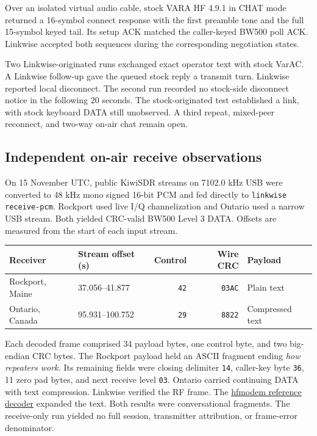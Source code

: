 \documentclass[11pt,a4paper]{article}
\begin{document}
Over an isolated virtual audio cable, stock VARA HF 4.9.1 in CHAT mode
returned a 16-symbol connect response with the first preamble tone and
the full 15-symbol keyed tail. Its setup ACK matched the caller-keyed
BW500 poll ACK. Linkwise accepted both sequences during the corresponding
negotiation states.

Two Linkwise-originated runs exchanged exact operator text with stock
VarAC. A Linkwise follow-up gave the queued stock reply a transmit turn.
Linkwise reported local disconnect. The second run recorded no stock-side
disconnect notice in the following 20 seconds. The stock-originated
test established a link, with stock keyboard DATA still unobserved.
A third repeat, mixed-peer reconnect, and two-way on-air chat remain open.

\subsection{Independent on-air receive observations}
On 15 November UTC, public KiwiSDR streams on 7102.0 kHz USB were
converted to 48 kHz mono signed 16-bit PCM and fed directly to
\verb|linkwise receive-pcm|. Rockport used live I/Q channelization and
Ontario used a narrow USB stream. Both yielded CRC-valid BW500 Level 3
DATA. Offsets are measured from the start of each input stream.

\begin{center}
\begin{tabular}{@{}llrrl@{}}
\toprule
Receiver & Stream offset (s) & Control & Wire CRC & Payload \\
\midrule
Rockport, Maine & 37.056--41.877 & \texttt{42} & \texttt{03AC} & Plain text \\
Ontario, Canada & 95.931--100.752 & \texttt{29} & \texttt{8822} & Compressed text \\
\bottomrule
\end{tabular}
\end{center}

Each decoded frame comprised 34 payload bytes, one control byte, and
two big-endian CRC bytes. The Rockport payload held an ASCII fragment
ending \emph{how repeaters work.} Its remaining fields were closing
delimiter \texttt{14}, caller-key byte \texttt{36}, 11 zero pad bytes,
and next receive level \texttt{03}. Ontario carried continuing DATA
with text compression. Linkwise verified the RF frame. The
\href{https://github.com/sstjohn/hfmodem/blob/952f79245240132f4af209afbad1f4b2ba256613/packages/hfmodem/hfmodem/kestrel/vara/compression.py}{hfmodem reference decoder}
expanded the text. Both results were conversational fragments. The
receive-only run yielded no full session, transmitter attribution,
or frame-error denominator.
\end{document}
